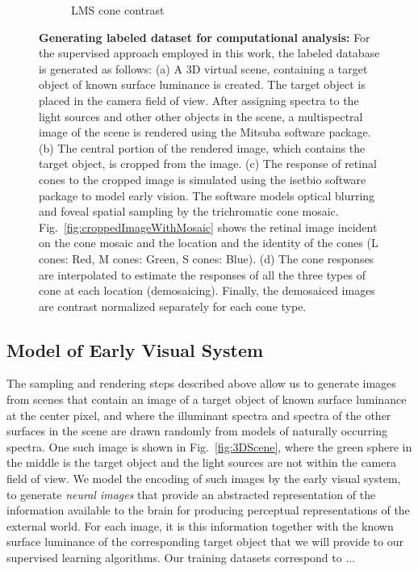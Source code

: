 \documentclass{jov}
\begin{document}
\begin{figure}
\begin{subfigure}[b]{0.2 \textwidth}
        \caption{LMS cone contrast}
        \label{fig:coneContrast}
    \end{subfigure}
    \label{fig:sceneWithCroppedImage}
    \caption{{\bf Generating labeled dataset for computational analysis:}  For the supervised approach employed in this work, the labeled database is generated as follows: (a) A 3D virtual scene, containing a target object of known surface luminance is created. The target object is placed in the camera field of view. After assigning spectra to the light sources and other other objects in the scene, a multispectral image of the scene is rendered using the Mitsuba software package. (b) The central portion of the rendered image, which contains the target object, is cropped from the image. (c) The response of retinal cones to the cropped image is simulated using the isetbio software package to model early vision. The software models optical blurring and foveal spatial sampling by the trichromatic cone mosaic. Fig.~\ref{fig:croppedImageWithMosaic} shows the retinal image incident on the cone mosaic and the location and the identity of the cones (L cones: Red, M cones: Green, S cones: Blue).  (d) The cone responses are interpolated to estimate the responses of all the three types of cone at each location (demosaicing). Finally, the demosaiced images are contrast normalized separately for each cone type.}
\end{figure}

\subsection{Model of Early Visual System} \label{method:Isetbio}

The sampling and rendering steps described above allow us to generate images from scenes that contain an image of a target object of known surface luminance at the center pixel, and where the illuminant spectra and spectra of the other surfaces in the scene are drawn randomly from models of naturally occurring spectra.  One such image is shown in Fig.~\ref{fig:3DScene}, where the green sphere in the middle is the target object and the light sources are not within the camera field of view. We model the encoding of such images by the early visual system, to generate {\em neural images} that provide an abstracted representation of the information available to the brain for producing perceptual representations of the external world. For each image, it is this information together with the known surface luminance of the corresponding target object that we will provide to our supervised learning algorithms.  Our training datasets correspond to ... %
\end{document}
